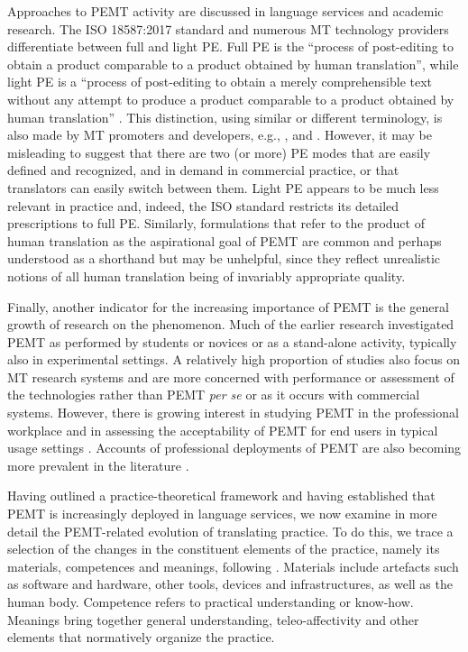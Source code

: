 \documentclass[output=paper,colorlinks,citecolor=brown]{langsci/langscibook}
\begin{document}
Approaches to PEMT activity are discussed in language services and academic research. The ISO 18587:2017 standard and numerous MT technology providers differentiate between full and light PE. Full PE is the \enquote{process of post-editing to obtain a product comparable to a product obtained by human translation}, while light PE is a \enquote{process of post-editing to obtain a merely comprehensible text without any attempt to produce a product comparable to a product obtained by human translation} \citep[2]{british_standards_institution_iso_2017}. This distinction, using similar or different terminology, is also made by MT promoters and developers, e.g., \citet{taus_mt_2015}, \citet{kantanmt_post-editing_nodate} and \citet{sdl_post-editing_nodate}. However, it may be misleading to suggest that there are two (or more) PE modes that are easily defined and recognized, and in demand in commercial practice, or that translators can easily switch between them. Light PE appears to be much less relevant in practice and, indeed, the ISO standard restricts its detailed prescriptions to full PE. Similarly, formulations that refer to the product of human translation as the aspirational goal of PEMT are common and perhaps understood as a shorthand but may be unhelpful, since they reflect unrealistic notions of all human translation being of invariably appropriate quality.      

Finally, another indicator for the increasing importance of PEMT is the general growth of research on the phenomenon. Much of the earlier research investigated PEMT as performed by students or novices or as a stand-alone activity, typically also in experimental settings. A relatively high proportion of studies also focus on MT research systems and are more concerned with performance or assessment of the technologies rather than PEMT \textit{per se} or as it occurs with commercial systems. However, there is growing interest in studying PEMT in the professional workplace \citep[e.g.,][]{gois_translator2vec:_2019,vardaro_translation_2019,macken_quantifying_2020} and in assessing the acceptability of PEMT for end users in typical usage settings \citep{girletti_preferences_2019}. Accounts of professional deployments of PEMT are also becoming more prevalent in the literature \citep{zaretskaya_optimising_2019,zaretskaya_raising_2019,kosmaczewska_application_2019,premoli_mtpe_2019,nunziatini_machine_2019}.

Having outlined a practice-theoretical framework and having established that PEMT is increasingly deployed in language services, we now examine in more detail the PEMT-related evolution of translating practice. To do this, we trace a selection of the changes in the constituent elements of the practice, namely its materials, competences and meanings, following \citet{shove_dynamics_2012}. Materials include artefacts such as software and hardware, other tools, devices and infrastructures, as well as the human body. Competence refers to practical understanding or know-how. Meanings bring together general understanding, teleo-affectivity and other elements that normatively organize the practice. 
\end{document}
